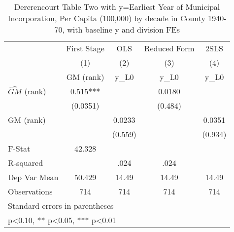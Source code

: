 \begin{table}[htbp]\centering
\def\sym#1{\ifmmode^{#1}\else\(^{#1}\)\fi}
\caption{Dererencourt Table Two with y=Earliest Year of Municipal Incorporation, Per Capita (100,000) by decade in County 1940-70, with baseline y and division FEs}
\begin{tabular}{l*{4}{c}}
\toprule
                    & First Stage   &         OLS   &Reduced Form   &        2SLS   \\
                    &\multicolumn{1}{c}{(1)}&\multicolumn{1}{c}{(2)}&\multicolumn{1}{c}{(3)}&\multicolumn{1}{c}{(4)}\\
                    &\multicolumn{1}{c}{GM  (rank)}&\multicolumn{1}{c}{y\_L0}&\multicolumn{1}{c}{y\_L0}&\multicolumn{1}{c}{y\_L0}\\
\midrule
$\hat{GM}$ (rank)   &       0.515***&               &      0.0180   &               \\
                    &    (0.0351)   &               &     (0.484)   &               \\
\addlinespace
GM  (rank)          &               &      0.0233   &               &      0.0351   \\
                    &               &     (0.559)   &               &     (0.934)   \\
\midrule
F-Stat              &      42.328   &               &               &               \\
R-squared           &               &        .024   &        .024   &               \\
Dep Var Mean        &      50.429   &       14.49   &       14.49   &       14.49   \\
Observations        &         714   &         714   &         714   &         714   \\
\bottomrule
\multicolumn{5}{l}{\footnotesize Standard errors in parentheses}\\
\multicolumn{5}{l}{\footnotesize * p<0.10, ** p<0.05, *** p<0.01}\\
\end{tabular}
\end{table}
